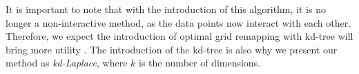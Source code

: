 It is important to note that with the introduction of this algorithm, it is no longer a non-interactive method, as the data points now interact with each other.
Therefore, we expect the introduction of optimal grid remapping with kd-tree will bring more utility \citep{wang_comprehensive_2020, xiongComprehensiveSurveyLocal2020}.
The introduction of the kd-tree is also why we present our method as \textit{kd-Laplace}, where $k$ is the number of dimensions.



\newpage


